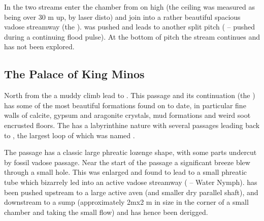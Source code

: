 In the  two streams enter the chamber from on high
(the ceiling was measured as being over 30 m up, by laser disto) and join into a rather beautiful spacious vadose streamway (the ).
 was pushed and leads to another split pitch ( -- pushed during a continuing flood pulse).
At the bottom of  pitch the stream continues and has not been explored.


\subsection{The Palace of King Minos}

North from the  a muddy climb lead to . This passage and its continuation (the ) has some of the most beautiful formations found on  to date, in particular fine walls of calcite, gypsum and aragonite crystals, mud formations and weird soot encrusted floors. The  has a labyrinthine nature with several passages leading back to , the largest loop of which was named .

The passage has a classic large phreatic lozenge shape, with some parts undercut by fossil vadose passage. Near the start of the passage a
significant breeze blew through a small hole. This was enlarged and found to lead to a small phreatic tube which bizarrely led into an active vadose streamway ( -- Water Nymph).  has been pushed upstream to a large active aven (and smaller dry parallel shaft), and downstream to a sump (approximately 2mx2 m in size in the corner of a small chamber and taking the small flow) and has hence been derigged.



